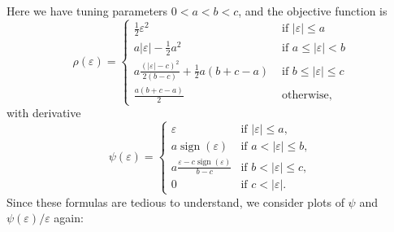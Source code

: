 \documentclass[
  a4paper,
]{article}
\theoremstyle{definition}
\theoremstyle{definition}
\theoremstyle{definition}
\theoremstyle{definition}
\theoremstyle{remark}
\begin{document}
Here we have tuning parameters \(0 < a < b < c\), and the objective function
is
\begin{equation*}
\rho(\varepsilon)
= \begin{cases}
\frac{1}{2}\varepsilon^2& \mbox{ if } |\varepsilon|\le a\\
a |\varepsilon|-\frac{1}{2} a^2 & \mbox{ if } a \le |\varepsilon| <b\\
a \frac{(|\varepsilon|-c)^2}{2(b-c)}+\frac{1}{2}a(b+c-a) & \mbox{ if } b \le |\varepsilon| \le c\\
\frac{a(b+c-a)}{2} & \mbox{ otherwise,}
\end{cases}
\end{equation*}
with derivative
\begin{equation*}
\psi(\varepsilon)
= \begin{cases}
\varepsilon& \mbox{if } |\varepsilon|\leq a, \\
a \mathop{\mathrm{sign}}(\varepsilon) & \mbox{if } a < |\varepsilon| \leq b, \\
a \frac{\varepsilon- c \mathop{\mathrm{sign}}(\varepsilon)}{b - c} & \mbox{if } b < |\varepsilon| \leq c, \\
0 & \mbox{if } c < |\varepsilon|.
\end{cases}
\end{equation*}
Since these formulas are tedious to understand, we consider plots
of \(\psi\) and \(\psi(\varepsilon) / \varepsilon\) again:
\end{document}
